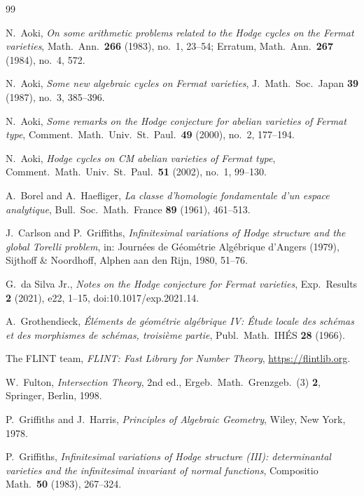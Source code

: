 \documentclass[11pt]{amsart}
\theoremstyle{definition}
\theoremstyle{remark}
\numberwithin{equation}{section}
\begin{document}
\begin{thebibliography}{99}

N.~Aoki, \emph{On some arithmetic problems related to the Hodge cycles on the Fermat varieties}, Math.\ Ann.\ \textbf{266} (1983), no.~1, 23--54; Erratum, Math.\ Ann.\ \textbf{267} (1984), no.~4, 572.

N.~Aoki, \emph{Some new algebraic cycles on Fermat varieties}, J.\ Math.\ Soc.\ Japan \textbf{39} (1987), no.~3, 385--396.

N.~Aoki, \emph{Some remarks on the Hodge conjecture for abelian varieties of Fermat type}, Comment.\ Math.\ Univ.\ St.\ Paul.\ \textbf{49} (2000), no.~2, 177--194.

N.~Aoki, \emph{Hodge cycles on CM abelian varieties of Fermat type}, Comment.\ Math.\ Univ.\ St.\ Paul.\ \textbf{51} (2002), no.~1, 99--130.

A.~Borel and A.~Haefliger, \emph{La classe d'homologie fondamentale d'un espace analytique}, Bull.\ Soc.\ Math.\ France \textbf{89} (1961), 461--513.

J.~Carlson and P.~Griffiths, \emph{Infinitesimal variations of Hodge structure and the global Torelli problem}, in: Journ\'ees de G\'eom\'etrie Alg\'ebrique d'Angers (1979), Sijthoff \& Noordhoff, Alphen aan den Rijn, 1980, 51--76.

G.~da Silva Jr., \emph{Notes on the Hodge conjecture for Fermat varieties}, Exp.\ Results \textbf{2} (2021), e22, 1--15, doi:10.1017/exp.2021.14.

A.~Grothendieck, \emph{\'El\'ements de g\'eom\'etrie alg\'ebrique IV: \'Etude locale des sch\'emas et des morphismes de sch\'emas, troisi\`eme partie}, Publ.\ Math.\ IH\'ES \textbf{28} (1966).

The FLINT team, \emph{FLINT: Fast Library for Number Theory}, \url{https://flintlib.org}.

W.~Fulton, \emph{Intersection Theory}, 2nd ed., Ergeb.\ Math.\ Grenzgeb.\ (3) \textbf{2}, Springer, Berlin, 1998.

P.~Griffiths and J.~Harris, \emph{Principles of Algebraic Geometry}, Wiley, New York, 1978.

P.~Griffiths, \emph{Infinitesimal variations of Hodge structure (III): determinantal varieties and the infinitesimal invariant of normal functions}, Compositio Math.\ \textbf{50} (1983), 267--324.


\end{thebibliography}
\end{document}
